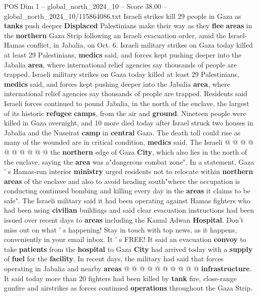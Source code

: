 \begin{textsample}{POS Dim 1 – global\_north\_2024\_10 – Score 38.00 – global\_north\_2024\_10/115864086.txt}  \label{ex:f1_pos_371}
Israeli strikes kill 29 people in Gaza as \textbf{tanks} push deeper \textbf{Displaced} Palestinians make their way as they \textbf{flee} \textbf{areas} in the \textbf{northern} Gaza Strip following an Israeli evacuation order, amid the Israel-Hamas conflict, in Jabalia, on Oct. 6.
Israeli military strikes on Gaza today killed at least 29 Palestinians, \textbf{medics} said, and forces kept pushing deeper into the Jabalia \textbf{area}, where international relief agencies say thousands of people are trapped.
Israeli military strikes on Gaza today killed at least 29 Palestinians, \textbf{medics} said, and forces kept pushing deeper into the Jabalia \textbf{area}, where international relief agencies say thousands of people are trapped.
Residents said Israeli forces continued to pound Jabalia, in the north of the enclave, the largest of its historic \textbf{refugee} \textbf{camps}, from the air and \textbf{ground}.
Nineteen people were killed in Gaza overnight, and 10 more died today after Israel struck two houses in Jabalia and the Nuseirat \textbf{camp} in \textbf{central} Gaza.
The death toll could rise as many of the wounded are in critical condition, \textbf{medics} said.
The Israeli @ @ @ @ @ @ @ @ @ @ the \textbf{northern} edge of Gaza \textbf{City}, which also lies in the north of the enclave, saying the \textbf{area} was a"dangerous combat zone".
In a statement, Gaza ' s Hamas-run interior \textbf{ministry} urged residents not to relocate within \textbf{northern} \textbf{areas} of the enclave and also to avoid heading south"where the occupation is conducting continued bombing and killing every day in the \textbf{areas} it claims to be safe".
The Israeli military said it had been operating against Hamas fighters who had been using \textbf{civilian} buildings and said clear evacuation instructions had been issued over recent days to \textbf{areas} including the Kamal Adwan \textbf{Hospital}.
Don't miss out on what ' s happening!
Stay in touch with top news, as it happens, conveniently in your email inbox.
It ' s FREE!
It said an evacuation \textbf{convoy} to take \textbf{patients} from the \textbf{hospital} to Gaza \textbf{City} had arrived today with a \textbf{supply} of \textbf{fuel} for the \textbf{facility}.
In recent days, the military had said that forces operating in Jabalia and nearby \textbf{areas} @ @ @ @ @ @ @ @ @ @ \textbf{infrastructure}.
It said today more than 20 fighters had been killed by \textbf{tank} fire, close-range gunfire and airstrikes as forces continued \textbf{operations} throughout the Gaza Strip.

\end{textsample}
